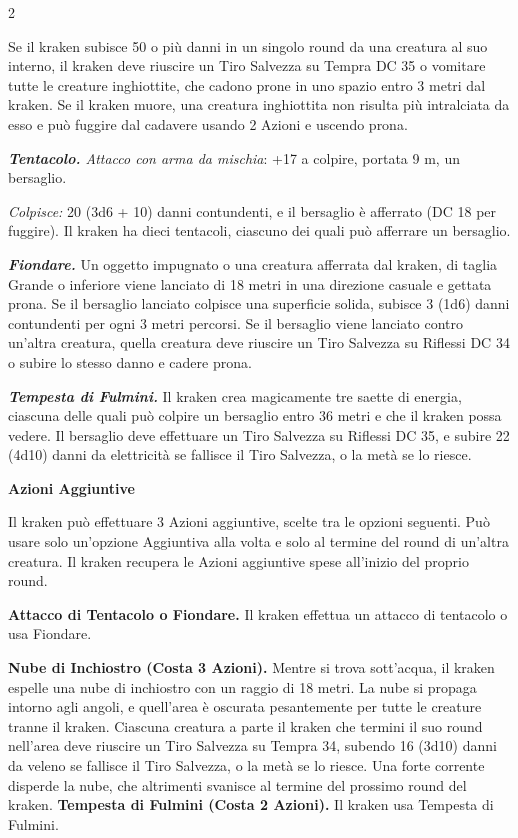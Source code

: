 \begin{multicols}{2}
{Se il kraken subisce 50 o più danni in un singolo round da una creatura al suo interno, il kraken deve riuscire un Tiro Salvezza su Tempra DC 35 o vomitare tutte le creature inghiottite, che cadono prone in uno spazio entro 3 metri dal kraken. Se il kraken muore, una creatura inghiottita non risulta più intralciata da esso e può fuggire dal cadavere usando 2 Azioni e uscendo prona.

\emph{\textbf{Tentacolo.} Attacco con arma da mischia}: +17 a colpire, portata 9 m, un bersaglio.

\emph{Colpisce:} 20 (3d6 + 10) danni contundenti, e il bersaglio è afferrato (DC 18 per fuggire). Il kraken ha dieci tentacoli, ciascuno dei quali può afferrare un bersaglio.

\emph{\textbf{Fiondare.}} Un oggetto impugnato o una creatura afferrata dal kraken, di taglia Grande o inferiore viene lanciato di 18 metri in una direzione casuale e gettata prona. Se il bersaglio lanciato colpisce una superficie solida, subisce 3 (1d6) danni contundenti per ogni 3 metri percorsi. Se il bersaglio viene lanciato contro un'altra creatura, quella creatura deve riuscire un Tiro Salvezza su Riflessi DC 34 o subire lo stesso danno e cadere prona.

\emph{\textbf{Tempesta di Fulmini.}} Il kraken crea magicamente tre saette di energia, ciascuna delle quali può colpire un bersaglio entro 36 metri e che il kraken possa vedere. Il bersaglio deve effettuare un Tiro Salvezza su Riflessi DC 35, e subire 22 (4d10) danni da elettricità se fallisce il Tiro Salvezza, o la metà se lo riesce.

\textbf{Azioni Aggiuntive}

Il kraken può effettuare 3 Azioni aggiuntive, scelte tra le opzioni seguenti. Può usare solo un'opzione Aggiuntiva alla volta e solo al termine del round di un'altra creatura. Il kraken recupera le Azioni aggiuntive spese all'inizio del proprio round.

\textbf{Attacco di Tentacolo o Fiondare.} Il kraken effettua un attacco di tentacolo o usa Fiondare.

\textbf{Nube di Inchiostro (Costa 3 Azioni).} Mentre si trova sott'acqua, il kraken espelle una nube di inchiostro con un raggio di 18 metri. La nube si propaga intorno agli angoli, e quell'area è oscurata pesantemente per tutte le creature tranne il kraken. Ciascuna creatura a parte il kraken che termini il suo round nell'area deve riuscire un Tiro Salvezza su Tempra 34, subendo 16 (3d10) danni da veleno se fallisce il Tiro Salvezza, o la metà se lo riesce. Una forte corrente disperde la nube, che altrimenti svanisce al termine del prossimo round del kraken. \textbf{Tempesta di Fulmini (Costa 2 Azioni).} Il kraken usa Tempesta di Fulmini.

}
\end{multicols}
